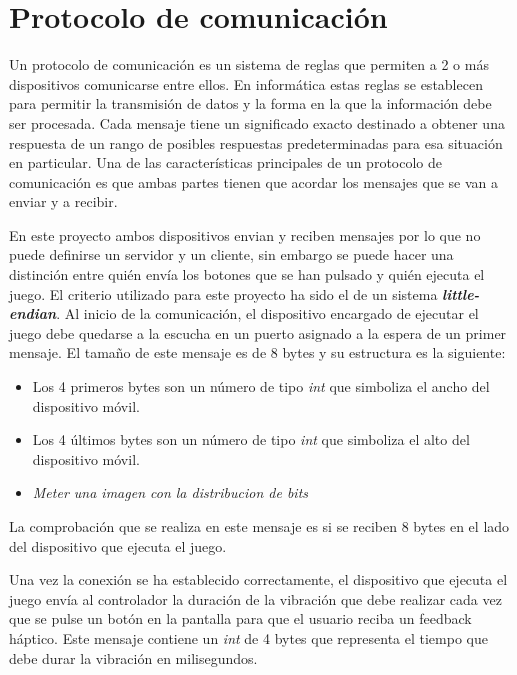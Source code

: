 \section{Protocolo de comunicaci\'on}

Un protocolo de comunicaci\'on es un sistema de reglas que permiten a 2 o m\'as dispositivos comunicarse entre ellos. En inform\'atica estas reglas se establecen para permitir la transmisi\'on de datos y la forma en la que la informaci\'on debe ser procesada. Cada mensaje tiene un significado exacto destinado a obtener una respuesta de un rango de posibles respuestas predeterminadas para esa situaci\'on en particular. Una de las caracter\'isticas principales de un protocolo de comunicaci\'on es que ambas partes tienen que acordar los mensajes que se van a enviar y a recibir. 

En este proyecto ambos dispositivos envian y reciben mensajes por lo que no puede definirse un servidor y un cliente, sin embargo se puede hacer una distinci\'on entre qui\'en env\'ia los botones que se han pulsado y qui\'en ejecuta el juego. El criterio utilizado para este proyecto ha sido el de un sistema \textbf{\textit{little-endian}}. Al inicio de la comunicaci\'on, el dispositivo encargado de ejecutar el juego debe quedarse a la escucha en un puerto asignado a la espera de un primer mensaje. El tama\~no de este mensaje es de 8 bytes y su estructura es la siguiente:

\begin {itemize}
\item Los 4 primeros bytes son un n\'umero de tipo \textit{int} que simboliza el ancho del dispositivo m\'ovil.
\item Los 4 \'ultimos bytes son un n\'umero de tipo \textit{int} que simboliza el alto del dispositivo m\'ovil.
\item \textit{Meter una imagen con la distribucion de bits}
\end {itemize}

La comprobaci\'on que se realiza en este mensaje es si se reciben 8 bytes en el lado del dispositivo que ejecuta el juego.

Una vez la conexi\'on se ha establecido correctamente, el dispositivo que ejecuta el juego env\'ia al controlador la duraci\'on de la vibraci\'on que debe realizar cada vez que se pulse un bot\'on en la pantalla para que el usuario reciba un feedback h\'aptico. Este mensaje contiene un \textit{int} de 4 bytes que representa el tiempo que debe durar la vibraci\'on en milisegundos.

